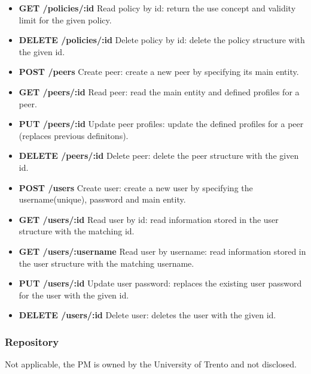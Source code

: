 \begin{itemize}
\item {\bf GET /policies/:id} Read policy by id: return the use concept and validity limit for the given policy.
\item {\bf DELETE /policies/:id} Delete policy by id: delete the policy structure with the given id.		
\item {\bf POST /peers}	Create peer: create a new peer by specifying its main entity.			
\item {\bf GET /peers/:id} Read peer: read the main entity and defined profiles for a peer.
\item {\bf PUT /peers/:id} Update peer profiles: update the defined profiles for a peer (replaces previous definitons).
\item {\bf DELETE /peers/:id} Delete peer: delete the peer structure with the given id.
\item {\bf POST /users}	Create user: create a new user by specifying the username(unique), password and main entity.											
\item {\bf GET /users/:id} Read user by id: read information stored in the user structure with the matching id.											
\item {\bf GET /users/:username}	Read user by username: read information stored in the user structure with the matching username.										
\item {\bf PUT /users/:id} Update user password: replaces the existing user password for the user with the given id.	
\item {\bf DELETE /users/:id} Delete user: deletes the user with the given id.
\end{itemize}
\subsubsection{Repository}
Not applicable, the PM is owned by the University of Trento and not disclosed. 
